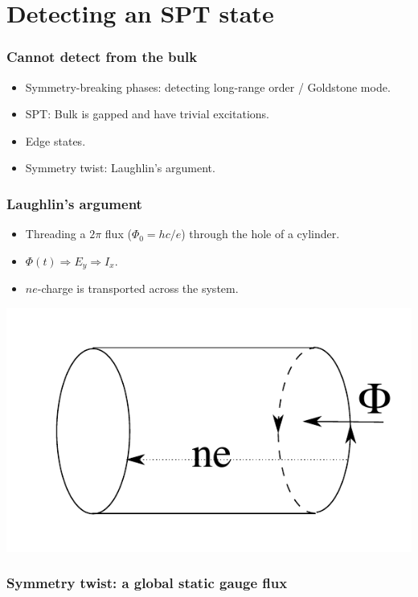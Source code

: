\documentclass[xcolor=table, aspectratio=43,ignorenonframetext]{beamer}
\begin{document}
\section{Detecting an SPT state}

\begin{frame}
	\frametitle{Cannot detect from the bulk}
	\begin{itemize}
		\item Symmetry-breaking phases: detecting long-range order / Goldstone mode.
		\item SPT: Bulk is gapped and have trivial excitations.
		\item Edge states.
		\item Symmetry twist: Laughlin's argument.
	\end{itemize}
	\begin{center}
	\end{center}
\end{frame}

\begin{frame}
	\frametitle{Laughlin's argument}
	\begin{itemize}
		\item Threading a $2\pi$ flux ($\Phi_0 = hc/e$) through the hole of a cylinder.
		\item $\Phi(t)\Rightarrow E_y\Rightarrow I_x$.
		\item $ne$-charge is transported across the system.
	\end{itemize}
	\includegraphics{laughlin}
\end{frame}

\begin{frame}
	\frametitle{Symmetry twist: a global static gauge flux}
\end{frame}
\end{document}
